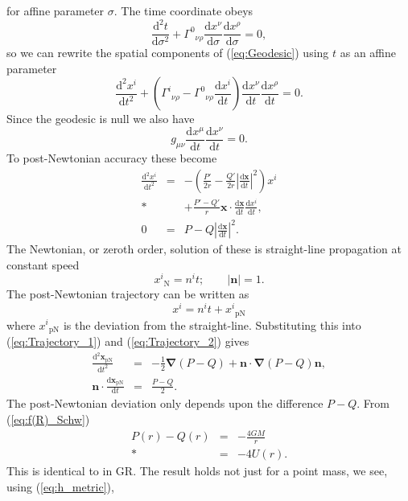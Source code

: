 \documentclass[aps,prd,amsfonts,amssymb,amsmath,nofootinbib,reprint,showpacs]{revtex4-1}
\newcommand{\eqnref}[1]{(\ref{eq:#1})}
\newcommand{\sub}[1]{\ensuremath{_\text{#1}}}
\newcommand{\dd}{\ensuremath{\text{d}}}
\newcommand{\diff}[2]{\ensuremath{\frac{\dd {#1}}{\dd {#2}}}}
\newcommand{\difftwo}[2]{\ensuremath{\frac{\dd^2 {#1}}{\dd {#2}^2}}}
\newcommand{\recip}[1]{\ensuremath{\frac{1}{#1}}}
\newcommand{\grad}{\ensuremath{\boldsymbol{\nabla}}}
\begin{document}
for affine parameter $\sigma$. The time coordinate obeys
\begin{equation}
\difftwo{t}{\sigma} + {\Gamma^0}_{\nu\rho}\diff{x^\nu}{\sigma}\diff{x^\rho}{\sigma} = 0,
\end{equation}
so we can rewrite the spatial components of \eqnref{Geodesic} using $t$ as an affine parameter~\cite{Will1993}
\begin{equation}
\difftwo{x^i}{t} + \left({\Gamma^i}_{\nu\rho} - {\Gamma^0}_{\nu\rho}\diff{x^i}{t}\right)\diff{x^\nu}{t}\diff{x^\rho}{t} = 0.
\end{equation}
Since the geodesic is null we also have
\begin{equation}
g_{\mu\nu}\diff{x^\mu}{t}\diff{x^\nu}{t} = 0.
\end{equation}
To post-Newtonian accuracy these become
\begin{eqnarray}
\label{eq:Trajectory_1}
\difftwo{x^i}{t} & = & -\left(\frac{P'}{2r} - \frac{Q'}{2r}\left|\diff{\boldsymbol{x}}{t}\right|^2\right)x^i \nonumber \\* 
 & & + {} \frac{P' - Q'}{r}\boldsymbol{x}\cdot\diff{\boldsymbol{x}}{t}\diff{x^i}{t}, \\
0 & = & P - Q\left|\diff{\boldsymbol{x}}{t}\right|^2.
\label{eq:Trajectory_2}
\end{eqnarray}
The Newtonian, or zeroth order, solution of these is straight-line propagation at constant speed~\cite{Will1993}
\begin{equation}
x^i\sub{N} = n^it; \qquad |\boldsymbol{n}| = 1.
\end{equation}
The post-Newtonian trajectory can be written as
\begin{equation}
x^i = n^it + x^i\sub{pN}
\end{equation}
where $x^i\sub{pN}$ is the deviation from the straight-line. Substituting this into \eqnref{Trajectory_1} and \eqnref{Trajectory_2} gives
\begin{eqnarray}
\difftwo{\boldsymbol{x}\sub{pN}}{t} & = & -\recip{2}\grad(P - Q) + \boldsymbol{n}\cdot\grad(P - Q)\boldsymbol{n}, \\
\boldsymbol{n}\cdot\diff{\boldsymbol{x}\sub{pN}}{t} & = & \frac{P - Q}{2}.
\end{eqnarray}
The post-Newtonian deviation only depends upon the difference $P - Q$. From \eqnref{f(R)_Schw}
\begin{eqnarray}
P(r) - Q(r) & = & -\frac{4GM}{r} \nonumber \\*
 & = & -4U(r).
\end{eqnarray}
This is identical to in GR. The result holds not just for a point mass, we see, using \eqnref{h_metric},
\end{document}
